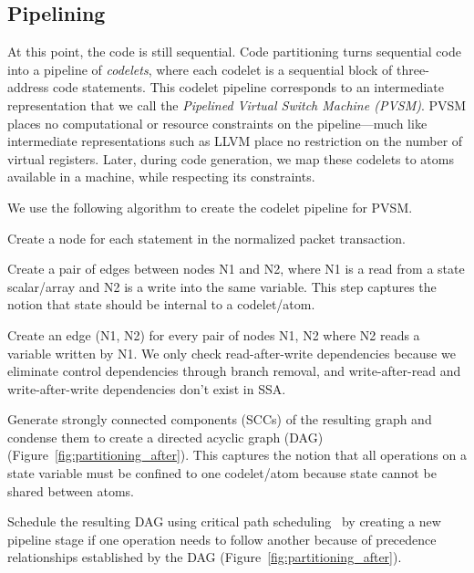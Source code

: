 \subsection{Pipelining}
\label{ss:partitioning}
At this point, the code is still sequential. Code partitioning turns sequential
code into a pipeline of \textit{codelets}, where each codelet is a sequential
block of three-address code statements. This codelet pipeline corresponds to an
intermediate representation that we call the \textit{Pipelined Virtual Switch
Machine (PVSM)}. PVSM places no computational or resource constraints on the
pipeline---much like intermediate representations such as LLVM place no
restriction on the number of virtual registers. Later, during code generation,
we map these codelets to atoms available in a \absmachine machine, while
respecting its constraints.

We use the following algorithm to create the codelet pipeline for PVSM.
\begin{CompactEnumerate}
  \item Create a node for each statement in the normalized packet transaction.
  \item Create a pair of edges between nodes N1 and N2, where N1 is a read from
    a state scalar/array and N2 is a write into the same variable.  This step
    captures the notion that state should be internal to a codelet/atom.
  \item Create an edge (N1, N2) for every pair of nodes N1, N2 where N2 reads a
    variable written by N1. We only check read-after-write dependencies because
    we eliminate control dependencies through branch removal, and
    write-after-read and write-after-write dependencies don't exist in SSA.
  \item Generate strongly connected components (SCCs) of the resulting graph
    and condense them to create a directed acyclic graph (DAG)
    (Figure~\ref{fig:partitioning_after}). This captures the notion that all
    operations on a state variable must be confined to one codelet/atom because
    state cannot be shared between atoms.
  \item Schedule the resulting DAG using critical path
    scheduling~\cite{crit_path_sched} by creating a new pipeline stage
    if one operation needs to follow another because of precedence
    relationships established by the DAG
    (Figure~\ref{fig:partitioning_after}).
\end{CompactEnumerate}

